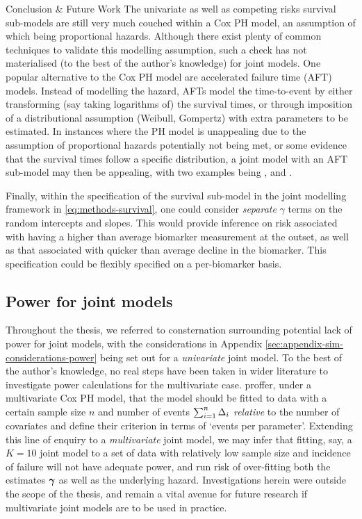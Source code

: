 \begin{chapter}{\label{cha:conclusion}Conclusion \& Future Work}
The univariate as well as competing risks survival sub-models are still very much couched within a Cox PH model, an assumption of which being proportional hazards. Although there exist plenty of common techniques to validate this modelling assumption, such a check has not materialised (to the best of the author's knowledge) for joint models. One popular alternative to the Cox PH model are accelerated failure time (AFT) models. Instead of modelling the hazard, AFTs model the time-to-event by either transforming (say taking logarithms of) the survival times, or through imposition of a distributional assumption (\eg Weibull, Gompertz) with extra parameters to be estimated. In instances where the PH model is unappealing due to the assumption of proportional hazards potentially not being met, or some evidence that the survival times follow a specific distribution, a joint model with an AFT sub-model may then be appealing, with two examples being \citet{Tseng2005}, and \citet{Khan2022}.

Finally, within the specification of the survival sub-model in the joint modelling framework in \eqref{eq:methods-survival}, one could consider \textit{separate} $\gamma$ terms on the random intercepts and slopes. This would provide inference on \eg risk associated with having a higher than average biomarker measurement at the outset, as well as that associated with quicker than average decline in the biomarker. This specification could be flexibly specified on a per-biomarker basis.

\subsection{Power for joint models}\label{sec:conclusions-future-power}
Throughout the thesis, we referred to consternation surrounding potential lack of power for joint models, with the considerations in Appendix \ref{sec:appendix-sim-considerations-power} being set out for a \textit{univariate} joint model. To the best of the author's knowledge, no real steps have been taken in wider literature to investigate power calculations for the multivariate case. \citet{Riley2019} proffer, under a multivariate Cox PH model, that the model should be fitted to data with a certain sample size $n$ and number of events $\sum_{i=1}^n\Delta_i$ \textit{relative} to the number of covariates and define their criterion in terms of `events per parameter'. Extending this line of enquiry to a \textit{multivariate} joint model, we may infer that fitting, say, a $K=10$ joint model to a set of data with relatively low sample size and incidence of failure will not have adequate power, and run risk of over-fitting both the estimates $\bm{\gamma}$ as well as the underlying hazard. Investigations herein were outside the scope of the thesis, and remain a vital avenue for future research if multivariate joint models are to be used in practice.


\end{chapter}
